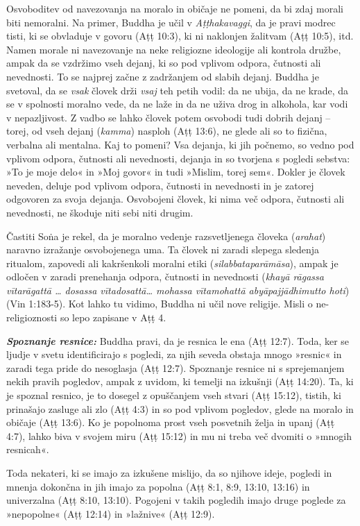 Osvoboditev od navezovanja na moralo in običaje ne pomeni, da bi zdaj
morali biti nemoralni. Na primer, Buddha je učil v \emph{Aṭṭhakavaggi},
da je pravi modrec tisti, ki se obvladuje v govoru (Aṭṭ 10:3), ki ni
naklonjen žalitvam (Aṭṭ 10:5), itd. Namen morale ni navezovanje na neke
religiozne ideologije ali kontrola družbe, ampak da se vzdržimo vseh
dejanj, ki so pod vplivom odpora, čutnosti ali nevednosti. To se najprej
začne z zadržanjem od slabih dejanj. Buddha je svetoval, da se
\emph{vsak} človek drži \emph{vsaj} teh petih vodil: da ne ubija, da ne
krade, da se v spolnosti moralno vede, da ne laže in da ne uživa drog in
alkohola, kar vodi v nepazljivost. Z vadbo se lahko človek potem
osvobodi tudi dobrih dejanj -- torej, od vseh dejanj (\emph{kamma})
nasploh (Aṭṭ 13:6), ne glede ali so to fizična, verbalna ali mentalna.
Kaj to pomeni? Vsa dejanja, ki jih počnemo, so vedno pod vplivom odpora,
čutnosti ali nevednosti, dejanja in so tvorjena s pogledi sebstva: »To
je moje delo« in »Moj govor« in tudi »Mislim, torej sem«. Dokler je
človek neveden, deluje pod vplivom odpora, čutnosti in nevednosti in je
zatorej odgovoren za svoja dejanja. Osvobojeni človek, ki nima več
odpora, čutnosti ali nevednosti, ne škoduje niti sebi niti drugim.

Častiti Soṅa je rekel, da je moralno vedenje razsvetljenega človeka
(\emph{arahat}) naravno izražanje osvobojenega uma. Ta človek ni zaradi
slepega sledenja ritualom, zapovedi ali kakršenkoli moralni etiki
(\emph{silabbataparāmāsa}), ampak je odločen v zaradi prenehanja odpora,
čutnosti in nevednosti (\emph{khayā rāgassa vītarāgattā \ldots{} dosassa
vītadosattā\ldots{} mohassa vītamohattā abyāpajjādhimutto hoti}) (Vin
1:183-5). Kot lahko tu vidimo, Buddha ni učil nove religije. Misli o
ne-religioznosti so lepo zapisane v Aṭṭ 4.

\textbf{\emph{Spoznanje resnice:} }Buddha pravi, da je resnica le ena
(Aṭṭ 12:7). Toda, ker se ljudje v svetu identificirajo s pogledi, za
njih seveda obstaja mnogo »resnic« in zaradi tega pride do nesoglasja
(Aṭṭ 12:7). Spoznanje resnice ni s sprejemanjem nekih pravih pogledov,
ampak z uvidom, ki temelji na izkušnji (Aṭṭ 14:20). Ta, ki je spoznal
resnico, je to dosegel z opuščanjem vseh stvari (Aṭṭ 15:12), tistih, ki
prinašajo zasluge ali zlo (Aṭṭ 4:3) in so pod vplivom pogledov, glede na
moralo in običaje (Aṭṭ 13:6). Ko je popolnoma prost vseh posvetnih želja
in upanj (Aṭṭ 4:7), lahko biva v svojem miru (Aṭṭ 15:12) in mu ni treba
več dvomiti o »mnogih resnicah«.

Toda nekateri, ki se imajo za izkušene mislijo, da so njihove ideje,
pogledi in mnenja dokončna in jih imajo za popolna (Aṭṭ 8:1, 8:9, 13:10,
13:16) in univerzalna (Aṭṭ 8:10, 13:10). Pogojeni v takih pogledih imajo
druge poglede za »nepopolne« (Aṭṭ 12:14) in »lažnive« (Aṭṭ 12:9).

